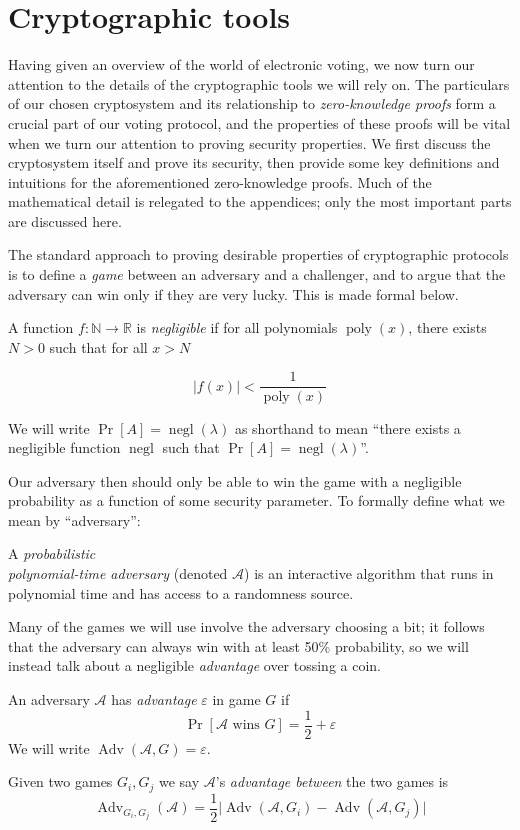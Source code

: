 \documentclass[12pt,a4paper]{article}
\DeclareMathOperator{\poly}{\text{poly}}
\DeclareMathOperator{\negl}{\text{negl}}
\DeclareMathOperator{\Adv}{\text{Adv}}
\theoremstyle{definition}
\begin{document}
\section{Cryptographic tools}\label{sec-crypto}
Having given an overview of the world of electronic voting, we now turn our attention to the details of the cryptographic tools we will rely on. The particulars of our chosen cryptosystem and its relationship to \textit{zero-knowledge proofs} form a crucial part of our voting protocol, and the properties of these proofs will be vital when we turn our attention to proving security properties. We first discuss the cryptosystem itself and prove its security, then provide some key definitions and intuitions for the aforementioned zero-knowledge proofs. Much of the mathematical detail is relegated to the appendices; only the most important parts are discussed here.

The standard approach to proving desirable properties of cryptographic protocols is to define a \textit{game} between an adversary and a challenger, and to argue that the adversary can win only if they are very lucky. This is made formal below.
\begin{definition}
    A function $f:\mathbb{N}\rightarrow\mathbb{R}$ is \textit{negligible} if for all polynomials $\poly(x)$, there exists $N>0$ such that for all $x>N$

    $$|f(x)|<\frac{1}{\poly(x)}$$

    We will write $\Pr[A]=\negl(\lambda)$ as shorthand to mean ``there exists a negligible function $\negl$ such that $\Pr[A]=\negl(\lambda)$''.
\end{definition}

Our adversary then should only be able to win the game with a negligible probability as a function of some security parameter. To formally define what we mean by ``adversary'':
\begin{definition}
    A \textit{probabilistic}\\\textit{polynomial-time adversary} (denoted $\mathcal{A}$) is an interactive algorithm that runs in polynomial time and has access to a randomness source.
\end{definition}

Many of the games we will use involve the adversary choosing a bit; it follows that the adversary can always win with at least 50\% probability, so we will instead talk about a negligible \textit{advantage} over tossing a coin. 
\begin{definition}[Advantage]
    An adversary $\mathcal{A}$ has \textit{advantage} $\varepsilon$ in game $G$ if
    $$\Pr\left[\mathcal{A}\text{ wins }G\right]=\frac{1}{2} + \varepsilon$$
    We will write $\Adv(\mathcal{A}, G)=\varepsilon$.

    Given two games $G_i, G_j$ we say $\mathcal{A}$'s \textit{advantage between} the two games is
    $$\Adv_{G_i, G_j}(\mathcal{A}) = \frac{1}{2}
    \Big|
        \Adv(\mathcal{A}, G_i)
         -
        \Adv(\mathcal{A}, G_j)
    \Big|$$
\end{definition}
\end{document}
